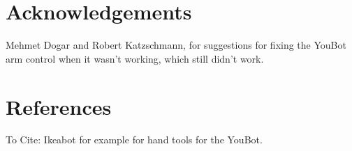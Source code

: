 \documentclass[conference]{acmsiggraph}
\begin{document}
\section*{Acknowledgements}

Mehmet Dogar and Robert Katzschmann, for suggestions for fixing the YouBot arm control when it wasn't working, which still didn't work.

\section{References}
To Cite:
Ikeabot for example for hand tools for the YouBot.




\end{document}
